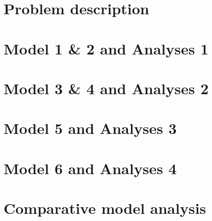 \documentclass[11pt]{article}
\begin{document}


\tableofcontents
\newpage

\section{Problem description} \label{Inleiding}


\section{Model 1 \& 2 and Analyses 1} \label{Inleiding}
 

\section{Model 3 \& 4 and Analyses 2} \label{Inleiding}
 

\section{Model 5 and Analyses 3} \label{Inleiding}


\section{Model 6 and Analyses 4} \label{Inleiding}


\section{Comparative model analysis} \label{Inleiding}




\end{document}
